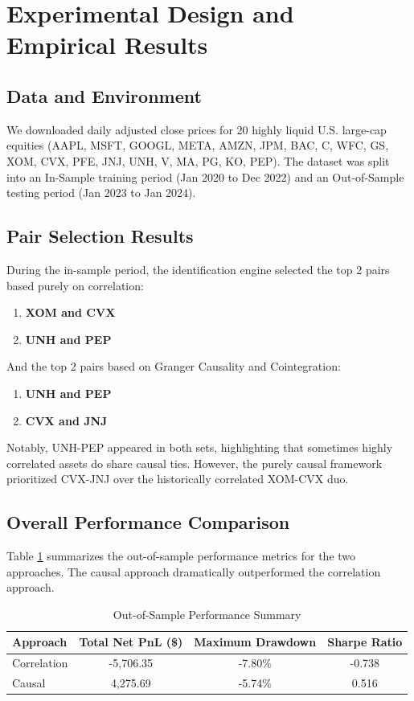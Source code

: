 \documentclass[12pt,a4paper]{article}
\begin{document}
\section{Experimental Design and Empirical Results}

\subsection{Data and Environment}
We downloaded daily adjusted close prices for 20 highly liquid U.S. large-cap equities (AAPL, MSFT, GOOGL, META, AMZN, JPM, BAC, C, WFC, GS, XOM, CVX, PFE, JNJ, UNH, V, MA, PG, KO, PEP). The dataset was split into an In-Sample training period (Jan 2020 to Dec 2022) and an Out-of-Sample testing period (Jan 2023 to Jan 2024).

\subsection{Pair Selection Results}
During the in-sample period, the identification engine selected the top 2 pairs based purely on correlation:
\begin{enumerate}
    \item \textbf{XOM and CVX}
    \item \textbf{UNH and PEP}
\end{enumerate}
And the top 2 pairs based on Granger Causality and Cointegration:
\begin{enumerate}
    \item \textbf{UNH and PEP}
    \item \textbf{CVX and JNJ}
\end{enumerate}
Notably, UNH-PEP appeared in both sets, highlighting that sometimes highly correlated assets do share causal ties. However, the purely causal framework prioritized CVX-JNJ over the historically correlated XOM-CVX duo.

\subsection{Overall Performance Comparison}
Table \ref{tab:results} summarizes the out-of-sample performance metrics for the two approaches. The causal approach dramatically outperformed the correlation approach.

\begin{table}[H]
    \centering
    \caption{Out-of-Sample Performance Summary}
    \label{tab:results}
    \begin{tabular}{@{}lccc@{}}
        \toprule
        \textbf{Approach} & \textbf{Total Net PnL (\$)} & \textbf{Maximum Drawdown} & \textbf{Sharpe Ratio} \\
        \midrule
        Correlation & -5,706.35 & -7.80\% & -0.738 \\
        Causal & 4,275.69 & -5.74\% & 0.516 \\
        \bottomrule
    \end{tabular}
\end{table}
\end{document}
